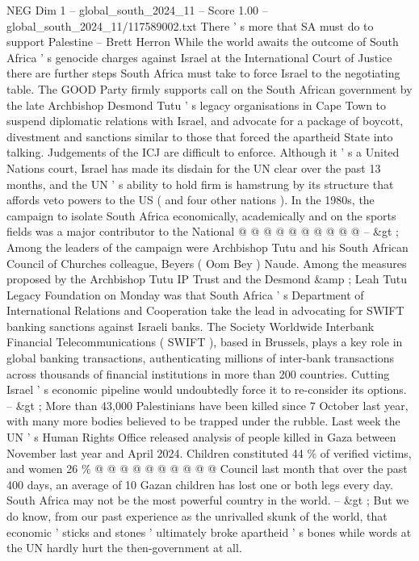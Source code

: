\begin{textsample}{NEG Dim 1 – global\_south\_2024\_11 – Score 1.00 – global\_south\_2024\_11/117589002.txt}  \label{ex:f1_neg_208}
There ' s more that SA must do to support Palestine -- Brett Herron While the world awaits the outcome of South Africa ' s genocide charges against Israel at the International Court of Justice there are further steps South Africa must take to force Israel to the negotiating table.
The GOOD Party firmly supports call on the South African government by the late Archbishop Desmond Tutu ' s legacy organisations in Cape Town to suspend diplomatic relations with Israel, and advocate for a package of boycott, divestment and sanctions similar to those that forced the apartheid State into talking.
Judgements of the ICJ are difficult to enforce.
Although it ' s a United Nations court, Israel has made its disdain for the UN clear over the past 13 months, and the UN ' s ability to hold firm is hamstrung by its structure that affords veto powers to the US ( and four other nations ).
In the 1980s, the campaign to isolate South Africa economically, academically and on the sports fields was a major contributor to the National @ @ @ @ @ @ @ @ @ @ -- \&gt ; Among the leaders of the campaign were Archbishop Tutu and his South African Council of Churches colleague, Beyers ( Oom Bey ) Naude.
Among the measures proposed by the Archbishop Tutu IP Trust and the Desmond \&amp ; Leah Tutu Legacy Foundation on Monday was that South Africa ' s Department of International Relations and Cooperation take the lead in advocating for SWIFT banking sanctions against Israeli banks.
The Society Worldwide Interbank Financial Telecommunications ( SWIFT ), based in Brussels, plays a key role in global banking transactions, authenticating millions of inter-bank transactions across thousands of financial institutions in more than 200 countries.
Cutting Israel ' s economic pipeline would undoubtedly force it to re-consider its options. -- \&gt ; More than 43,000 Palestinians have been killed since 7 October last year, with many more bodies believed to be trapped under the rubble.
Last week the UN ' s Human Rights Office released analysis of people killed in Gaza between November last year and April 2024.
Children constituted 44 \% of verified victims, and women 26 \% @ @ @ @ @ @ @ @ @ @ Council last month that over the past 400 days, an average of 10 Gazan children has lost one or both legs every day.
South Africa may not be the most powerful country in the world. -- \&gt ; But we do know, from our past experience as the unrivalled skunk of the world, that economic ' sticks and stones ' ultimately broke apartheid ' s bones while words at the UN hardly hurt the then-government at all.

\end{textsample}
